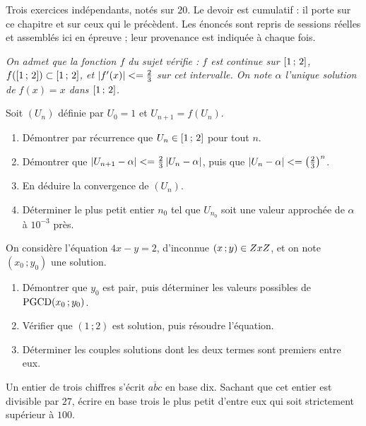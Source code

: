 \begin{devoir}[2 heures]
Trois exercices indépendants, notés sur $20$. Le devoir est cumulatif : il porte sur ce chapitre et sur ceux qui le précèdent. Les énoncés sont repris de sessions réelles et assemblés ici en épreuve ; leur provenance est indiquée à chaque fois.

\emph{On admet que la fonction $f$ du sujet vérifie : $f$ est continue sur
$\left[1\,;\,2\right]$, $f\!\left(\left[1\,;\,2\right]\right) \subset
\left[1\,;\,2\right]$, et $\left|f'(x)\right| <= \frac23$ sur cet intervalle. On note
$\alpha$ l'unique solution de $f(x) = x$ dans $\left[1\,;\,2\right]$.}

Soit $(U_{n})$ définie par $U_{0} = 1$ et $U_{n+1} = f(U_{n})$.
\begin{enumerate}[label=\textbf{\alph*)}, leftmargin=*, itemsep=0.15em]
  \item Démontrer par récurrence que $U_{n} \in \left[1\,;\,2\right]$ pour tout
        $n$.
  \item Démontrer que $\left|U_{n+1}-\alpha\right| <= \frac23\left|U_{n}-\alpha\right|$,
        puis que $\left|U_{n}-\alpha\right| <= \left(\frac23\right)^{n}$.
  \item En déduire la convergence de $(U_{n})$.
  \item Déterminer le plus petit entier $n_{0}$ tel que $U_{n_{0}}$ soit une
        valeur approchée de $\alpha$ à $10^{-3}$ près.
\end{enumerate}

On considère l'équation $4x-y = 2$, d'inconnue $(x\,;y) \in ZxZ$, et on
note $(x_{0}\,;y_{0})$ une solution.
\begin{enumerate}[label=\textbf{\arabic*)}, leftmargin=*, itemsep=0.15em]
  \item Démontrer que $y_{0}$ est pair, puis déterminer les valeurs possibles
        de $\operatorname{PGCD}(x_{0}\,;y_{0})$.
  \item Vérifier que $(1\,;2)$ est solution, puis résoudre l'équation.
  \item Déterminer les couples solutions dont les deux termes sont premiers
        entre eux.
\end{enumerate}

Un entier de trois chiffres s'écrit $\overline{abc}$ en base dix. Sachant que
cet entier est divisible par $27$, écrire en base trois le plus petit d'entre
eux qui soit strictement supérieur à $100$.

\end{devoir}

